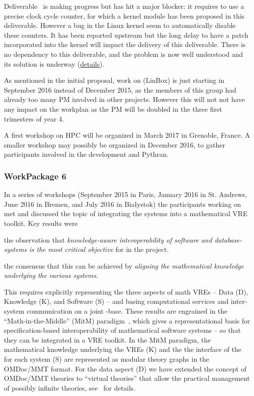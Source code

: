 \documentclass{deliverablereport}
\begin{document}
\begin{itemize}
Deliverable~ is making
progress but has hit a major blocker: it requires to use a precise
clock cycle counter, for which a kernel module has been proposed in
this deliverable. However a bug in the Linux kernel seem to
automatically disable these counters. It has been reported upstream
but the long delay to have a patch incorporated into the kernel will
impact the delivery of this deliverable. There is no dependency to
this deliverable, and the problem is now well understood and its
solution is underway
(\href{https://github.com/OpenDreamKit/OpenDreamKit/issues/118}{details}).

As mentioned in the initial proposal, work on
 (LinBox) is just starting in September 2016 instead
of December 2015, as the members of this group had already too many PM involved in other
projects. However this will not not have any impact on the workplan as the PM will be doubled
in the three first trimesters of year 4.

A first workshop on HPC will be organized in March 2017 in Grenoble,
France. A smaller workshop may possibly be organized in December 2016,
to gather participants involved in the development and Pythran.

\subsubsection{WorkPackage 6}
In a series of workshops (September 2015 in Paris, January 2016 in
St. Andrews, June 2016 in Bremen, and July 2016 in Bia{\l}ystok) the
participants working on  met and discussed the topic
of integrating the \pn systems into a mathematical VRE toolkit.  Key
results were
\begin{compactitem}[\bf R1.]
\item the observation that \emph{knowledge-aware interoperability of
    software and database-systems is the most critical objective} for
   in the \pn project.
\item the consensus that this can be achieved by \emph{aligning the
    mathematical knowledge underlying the various systems}.
\end{compactitem}
This requires explicitly representing the three aspects of math VREs
-- Data (D), Knowledge (K), and Software (S) -- and basing
computational services and inter-system communication on a joint
\DKS-base. These results are engrained in the ``Math-in-the-Middle''
(MitM) paradigm~\cite{DehKohKon:iop16}, which gives a representational
basis for specification-based interoperability of mathematical
software systems -- so that they can be integrated in a VRE
toolkit. In the MitM paradigm, the mathematical knowledge underlying
the VREs (K) and the the interface of the for each system (S) are
represented as modular theory graphs in the OMDoc/MMT format. For the
data aspect (D) we have extended the concept of OMDoc/MMT theories to
``virtual theories'' that allow the practical management of possibly
infinite theories, see~\cite{ODK-D6.2} for details.


\end{itemize}
\end{document}
